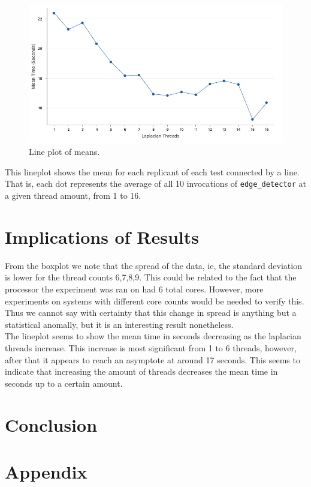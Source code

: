 \documentclass{article}
\begin{document}
\clearpage
\begin{figure}[h]
  \centering
  \includegraphics[width=1\textwidth]{./images/1.png}
  \caption{Line plot of means.}
  \label{fig:3_b_2}
\end{figure}
This lineplot shows the mean for each replicant of each test connected by a line.
That is, each dot represents the average of all 10 invocations of
\texttt{edge\_detector} at a given thread amount, from 1 to 16.

\section*{Implications of Results}
From the boxplot we note that the spread of the data,
ie, the standard deviation is lower for the thread counts 6,7,8,9.
This could be related to the fact that the processor the experiment was
ran on had 6 total cores.
However, more experiments on systems with different core counts
would be needed to verify this.
Thus we cannot say with certainty that this change in spread
is anything but a statistical anomally,
but it is an interesting result nonetheless. \\

The lineplot seems to show the mean time in seconds decreasing
as the laplacian threads increase. This increase is most significant
from 1 to 6 threads, however, after that it appears to reach an
asymptote at around 17 seconds. This seems to indicate that increasing
the amount of threads decreases the mean time in seconds up to a certain amount.
\section*{Conclusion}

\appendix
\section*{Appendix}
\end{document}
